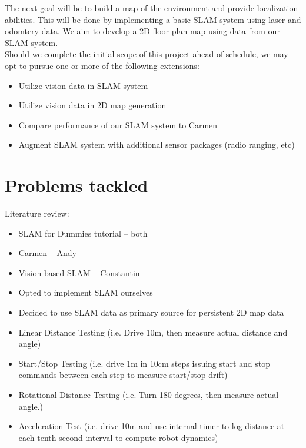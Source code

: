 \documentclass[12pt]{article}
\begin{document}
The next goal will be to build a map of the environment and provide
localization abilities. This will be done by implementing a basic SLAM
system using laser and odomtery data.  We aim to develop a 2D floor plan map
using data from our SLAM system.\\

Should we complete the initial scope of this project ahead of schedule, we may
opt to pursue one or more of the following extensions:

\begin{itemize}
    \setlength{\itemsep}{0pt}
    \setlength{\parskip}{0pt}
    \setlength{\parsep}{0pt}
    \item Utilize vision data in SLAM system
    \item Utilize vision data in 2D map generation
    \item Compare performance of our SLAM system to Carmen
    \item Augment SLAM system with additional sensor packages (radio ranging,
          etc)
\end{itemize}


\section{Problems tackled}

Literature review:
\begin{itemize}
    \setlength{\itemsep}{0pt}
    \setlength{\parskip}{0pt}
    \setlength{\parsep}{0pt}
    \item SLAM for Dummies tutorial -- both
    \item Carmen -- Andy
    \item Vision-based SLAM -- Constantin
\end{itemize}

\begin{itemize}
    \setlength{\itemsep}{0pt}
    \setlength{\parskip}{0pt}
    \setlength{\parsep}{0pt}
    \item Opted to implement SLAM ourselves
    \item Decided to use SLAM data as primary source for persistent 2D map data
\end{itemize}

\begin{itemize}
    \setlength{\itemsep}{0pt}
    \setlength{\parskip}{0pt}
    \setlength{\parsep}{0pt}
    \item Linear Distance Testing (i.e. Drive 10m, then measure actual
      distance and angle)
    \item Start/Stop Testing (i.e. drive 1m in 10cm steps issuing
      start and stop commands between each step to measure start/stop drift)
    \item Rotational Distance Testing (i.e. Turn 180 degrees, then measure
      actual angle.)
    \item Acceleration Test (i.e. drive 10m and use internal timer to log
      distance at each tenth second interval to compute robot dynamics)
\end{itemize}
\end{document}
